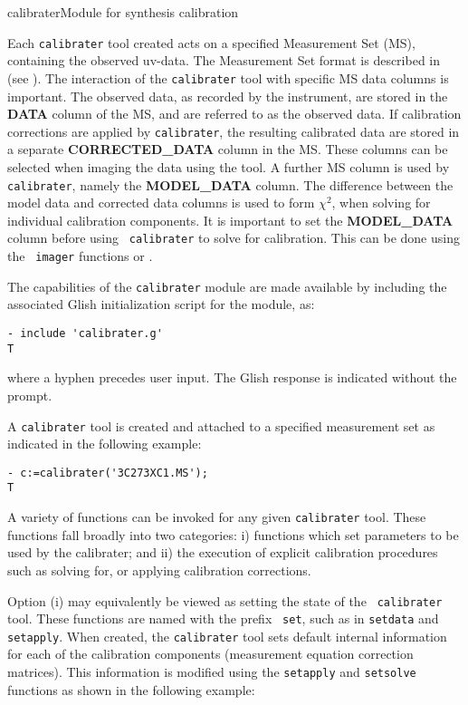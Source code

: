 \begin{ahmodule}{calibrater}{Module for synthesis calibration}
\begin{ahdescription}
Each {\tt calibrater} tool created acts on a specified Measurement Set
(MS), containing the observed uv-data. The Measurement Set format is
described in (see ). The interaction of the {\tt calibrater}
tool with specific MS data columns is important. The observed data, as
recorded by the instrument, are stored in the {\bf DATA} column of the
MS, and are referred to as the observed data. If calibration
corrections are applied by {\tt calibrater}, the resulting calibrated
data are stored in a separate {\bf CORRECTED\_DATA} column in the
MS. These columns can be selected when imaging the data using the
 tool. A further MS column is used by {\tt
calibrater}, namely the {\bf MODEL\_DATA} column. The difference
between the model data and corrected data columns is used to form
$\chi^2$, when solving for individual calibration components. It is
important to set the {\bf MODEL\_DATA} column before using {\tt
calibrater} to solve for calibration. This can be done using the {\tt
imager} functions  or
.

The capabilities of the {\tt calibrater} module are made available by
including the associated Glish initialization script for the module, as:

\begin{verbatim}
- include 'calibrater.g'
T
\end{verbatim}

where a hyphen precedes user input. The Glish response is indicated
without the prompt.

A {\tt calibrater} tool is created and attached to a specified
measurement set as indicated in the following example:

\begin{verbatim}
- c:=calibrater('3C273XC1.MS');
T
\end{verbatim}

A variety of functions can be invoked for any given {\tt calibrater}
tool. These functions fall broadly into two categories: i) functions
which set parameters to be used by the calibrater; and ii) the
execution of explicit calibration procedures such as solving for, or
applying calibration corrections.

Option (i) may equivalently be viewed as setting the state of the {\tt
calibrater} tool. These functions are named with the prefix {\tt
set}, such as in {\tt setdata} and {\tt setapply}. When created, the
{\tt calibrater} tool sets default internal information for each of
the calibration components (measurement equation correction
matrices). This information is modified using the {\tt setapply}
and {\tt setsolve} functions as shown in the following example:


\end{ahdescription}
\end{ahmodule}
